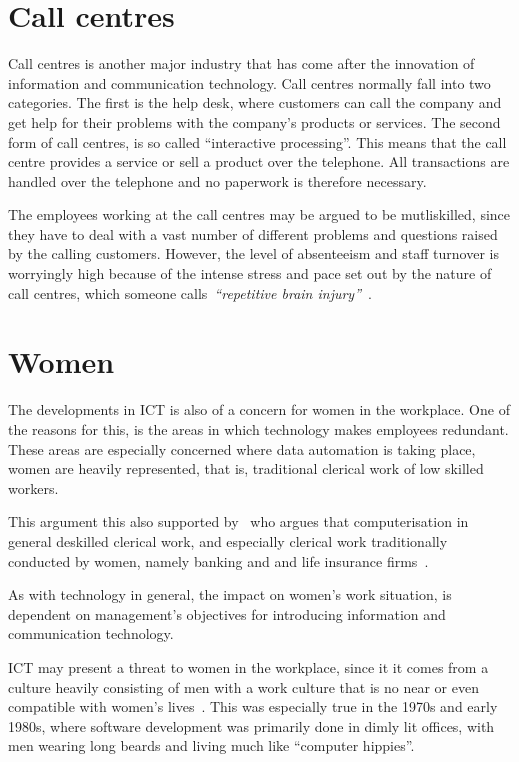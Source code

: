 \documentclass[a4paper,12pt,titlepage]{article}
\begin{document}
  \section{Call centres}
  Call centres is another major industry that has come after the
  innovation of information and communication technology. Call centres
  normally fall into two categories. The first is the help desk, where
  customers can call the company and get help for their problems with
  the company's products or services. The second form of call centres, is
  so called ``interactive processing''. This means that the call centre
  provides a service or sell a product over the telephone. All
  transactions are handled over the telephone and no paperwork is therefore
  necessary.

  The employees working at
  the call centres may be argued to be mutliskilled, since they have to deal with a vast
  number of different problems and questions raised by the calling
  customers. However, the level of absenteeism and staff turnover
  is worryingly high because of the intense stress and pace set out by the
  nature of call centres, which someone
  calls~\emph{``repetitive brain injury''}~\cite[96-7]{ahdb}.
  
  \section{Women}
  The developments in ICT is also of a concern for women in the workplace.
  One of the reasons for this, is the areas in which
  technology makes employees redundant. These areas are especially concerned where
  data automation is taking place, women are heavily represented, that
  is, traditional clerical work of low skilled workers.

  This argument this also supported by~ who argues that
  computerisation in general deskilled clerical work, and especially
  clerical work traditionally conducted by women, namely banking and
  and life insurance firms~\cite[145]{pa}.

  As with technology in general, the impact on women's work
  situation, is dependent on management's objectives for introducing
  information and communication technology.

  ICT may present a threat to women in the workplace, since it
  it comes from a culture heavily consisting of men with a work
  culture that is no near or even compatible with women's
  lives~\cite[156]{jw}. This was especially
  true in the 1970s and early 1980s, where
  software development was primarily done in dimly lit offices,
  with men wearing long beards and living much like ``computer hippies''.
\end{document}
